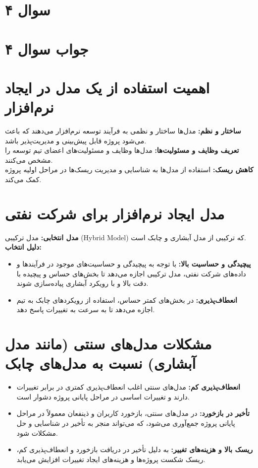 \section*{سوال ۴}



\section*{جواب سوال ۴}

\section*{ اهمیت استفاده از یک مدل در ایجاد نرم‌افزار}
\textbf{ساختار و نظم:} مدل‌ها ساختار و نظمی به فرآیند توسعه نرم‌افزار می‌دهند که باعث می‌شود پروژه قابل پیش‌بینی و مدیریت‌پذیر باشد. \\
\textbf{تعریف وظایف و مسئولیت‌ها:} مدل‌ها وظایف و مسئولیت‌های اعضای تیم توسعه را مشخص می‌کنند. \\
\textbf{کاهش ریسک:} استفاده از مدل‌ها به شناسایی و مدیریت ریسک‌ها در مراحل اولیه پروژه کمک می‌کند.

\section*{ مدل ایجاد نرم‌افزار برای شرکت نفتی}
\textbf{مدل انتخابی:} مدل ترکیبی (Hybrid Model) که ترکیبی از مدل آبشاری و چابک است. \\
\textbf{دلیل انتخاب:} \\
\begin{itemize}
	\item \textbf{پیچیدگی و حساسیت بالا:} با توجه به پیچیدگی و حساسیت‌های موجود در فرآیندها و داده‌های شرکت نفتی، مدل ترکیبی اجازه می‌دهد تا بخش‌های حساس و پیچیده با دقت بالا و با رویکرد آبشاری پیاده‌سازی شوند.
	\item \textbf{انعطاف‌پذیری:} در بخش‌های کمتر حساس، استفاده از رویکردهای چابک به تیم اجازه می‌دهد تا به سرعت به تغییرات پاسخ دهد.
\end{itemize}

\section*{ مشکلات مدل‌های سنتی (مانند مدل آبشاری) نسبت به مدل‌های چابک}
\begin{itemize}
	\item \textbf{انعطاف‌پذیری کم:} مدل‌های سنتی اغلب انعطاف‌پذیری کمتری در برابر تغییرات دارند و تغییرات اساسی در مراحل پایانی پروژه دشوار است.
	\item \textbf{تأخیر در بازخورد:} در مدل‌های سنتی، بازخورد کاربران و ذینفعان معمولاً در مراحل پایانی پروژه جمع‌آوری می‌شود، که می‌تواند منجر به تأخیر در شناسایی و حل مشکلات شود.
	\item \textbf{ریسک بالا و هزینه‌های تغییر:} به دلیل تأخیر در دریافت بازخورد و انعطاف‌پذیری کم، ریسک شکست پروژه‌ها و هزینه‌های ایجاد تغییرات افزایش می‌یابد.
\end{itemize}